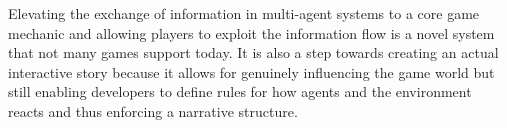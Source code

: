 Elevating the exchange of information in multi-agent systems to a core game mechanic and allowing players to exploit the information flow is a novel system that not many games support today. It is also a step towards creating an actual interactive story because it allows for genuinely influencing the game world but still enabling developers to define rules for how agents and the environment reacts and thus enforcing a narrative structure.